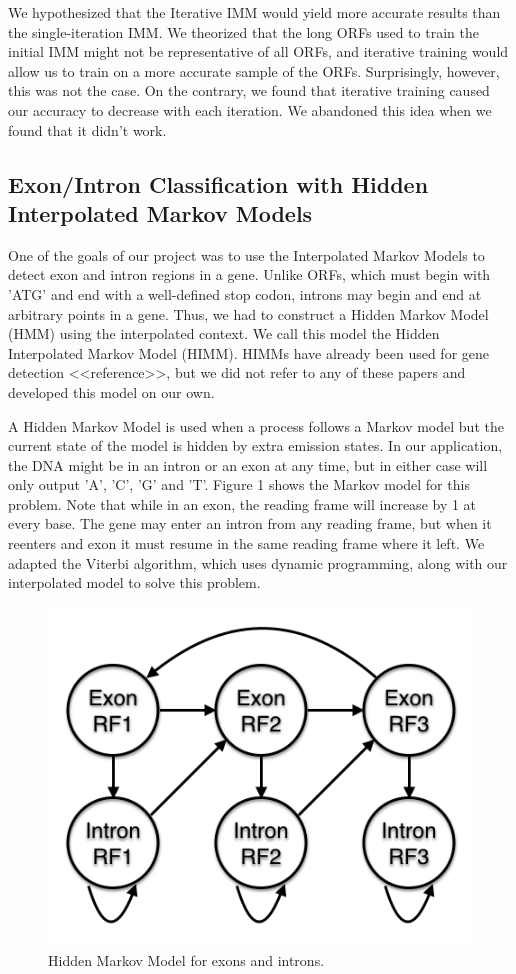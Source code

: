 \documentclass[11pt,letterpaper]{article}
\begin{document}
We hypothesized that the Iterative IMM would yield more accurate results than the single-iteration IMM. We theorized that the long ORFs used to train the initial IMM might not be representative of all ORFs, and iterative training would allow us to train on a more accurate sample of the ORFs. Surprisingly, however, this was not the case. On the contrary, we found that iterative training caused our accuracy to decrease with each iteration. We abandoned this idea when we found that it didn't work.


\subsection{Exon/Intron Classification with Hidden Interpolated Markov Models}
One of the goals of our project was to use the Interpolated Markov Models to detect exon and intron regions in a gene. Unlike ORFs, which must begin with 'ATG' and end with a well-defined stop codon, introns may begin and end at arbitrary points in a gene. Thus, we had to construct a Hidden Markov Model (HMM) using the interpolated context. We call this model the Hidden Interpolated Markov Model (HIMM). HIMMs have already been used for gene detection <<reference>>, but we did not refer to any of these papers and developed this model on our own.

A Hidden Markov Model is used when a process follows a Markov model but the current state of the model is hidden by extra emission states. In our application, the DNA might be in an intron or an exon at any time, but in either case will only output 'A', 'C', 'G' and 'T'. Figure 1 shows the Markov model for this problem. Note that while in an exon, the reading frame will increase by 1 at every base. The gene may enter an intron from any reading frame, but when it reenters and exon it must resume in the same reading frame where it left. We adapted the Viterbi algorithm, which uses dynamic programming, along with our interpolated model to solve this problem.

\begin{figure}
	\begin{center}
		\includegraphics[scale=0.4]{HMM.png}
	\end{center}
	\caption{\label{font-table} Hidden Markov Model for exons and introns.}
\end{figure}
\end{document}
